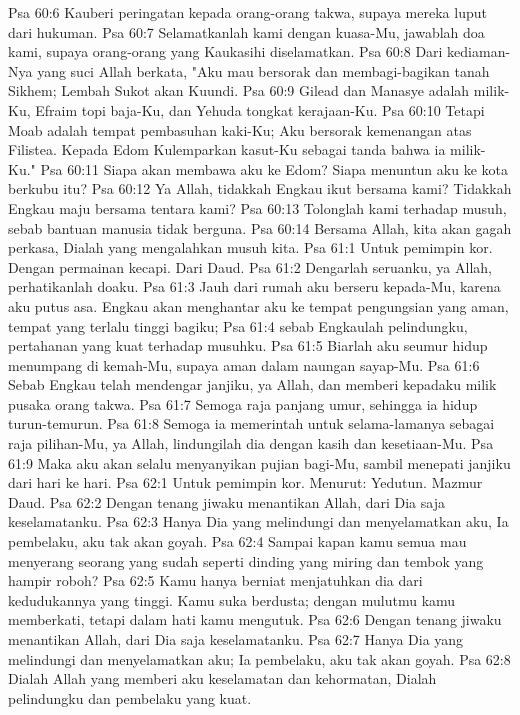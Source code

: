Psa 60:6  Kauberi peringatan kepada orang-orang takwa, supaya mereka luput dari hukuman.
Psa 60:7  Selamatkanlah kami dengan kuasa-Mu, jawablah doa kami, supaya orang-orang yang Kaukasihi diselamatkan.
Psa 60:8  Dari kediaman-Nya yang suci Allah berkata, "Aku mau bersorak dan membagi-bagikan tanah Sikhem; Lembah Sukot akan Kuundi.
Psa 60:9  Gilead dan Manasye adalah milik-Ku, Efraim topi baja-Ku, dan Yehuda tongkat kerajaan-Ku.
Psa 60:10  Tetapi Moab adalah tempat pembasuhan kaki-Ku; Aku bersorak kemenangan atas Filistea. Kepada Edom Kulemparkan kasut-Ku sebagai tanda bahwa ia milik-Ku."
Psa 60:11  Siapa akan membawa aku ke Edom? Siapa menuntun aku ke kota berkubu itu?
Psa 60:12  Ya Allah, tidakkah Engkau ikut bersama kami? Tidakkah Engkau maju bersama tentara kami?
Psa 60:13  Tolonglah kami terhadap musuh, sebab bantuan manusia tidak berguna.
Psa 60:14  Bersama Allah, kita akan gagah perkasa, Dialah yang mengalahkan musuh kita.
Psa 61:1  Untuk pemimpin kor. Dengan permainan kecapi. Dari Daud.
Psa 61:2  Dengarlah seruanku, ya Allah, perhatikanlah doaku.
Psa 61:3  Jauh dari rumah aku berseru kepada-Mu, karena aku putus asa. Engkau akan menghantar aku ke tempat pengungsian yang aman, tempat yang terlalu tinggi bagiku;
Psa 61:4  sebab Engkaulah pelindungku, pertahanan yang kuat terhadap musuhku.
Psa 61:5  Biarlah aku seumur hidup menumpang di kemah-Mu, supaya aman dalam naungan sayap-Mu.
Psa 61:6  Sebab Engkau telah mendengar janjiku, ya Allah, dan memberi kepadaku milik pusaka orang takwa.
Psa 61:7  Semoga raja panjang umur, sehingga ia hidup turun-temurun.
Psa 61:8  Semoga ia memerintah untuk selama-lamanya sebagai raja pilihan-Mu, ya Allah, lindungilah dia dengan kasih dan kesetiaan-Mu.
Psa 61:9  Maka aku akan selalu menyanyikan pujian bagi-Mu, sambil menepati janjiku dari hari ke hari.
Psa 62:1  Untuk pemimpin kor. Menurut: Yedutun. Mazmur Daud.
Psa 62:2  Dengan tenang jiwaku menantikan Allah, dari Dia saja keselamatanku.
Psa 62:3  Hanya Dia yang melindungi dan menyelamatkan aku, Ia pembelaku, aku tak akan goyah.
Psa 62:4  Sampai kapan kamu semua mau menyerang seorang yang sudah seperti dinding yang miring dan tembok yang hampir roboh?
Psa 62:5  Kamu hanya berniat menjatuhkan dia dari kedudukannya yang tinggi. Kamu suka berdusta; dengan mulutmu kamu memberkati, tetapi dalam hati kamu mengutuk.
Psa 62:6  Dengan tenang jiwaku menantikan Allah, dari Dia saja keselamatanku.
Psa 62:7  Hanya Dia yang melindungi dan menyelamatkan aku; Ia pembelaku, aku tak akan goyah.
Psa 62:8  Dialah Allah yang memberi aku keselamatan dan kehormatan, Dialah pelindungku dan pembelaku yang kuat.

